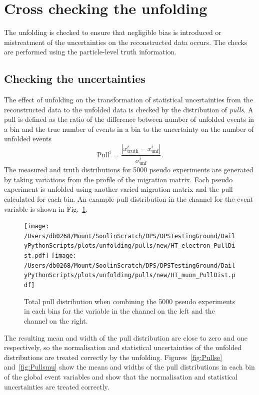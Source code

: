 \section{Cross checking the unfolding} %
\label{sec:cross_checking_the_unfolding}

The unfolding is checked to ensure that negligible bias is introduced or mistreatment of the uncertainties on the reconstructed data occurs. 
The checks are performed using the particle-level truth information.

\subsection{Checking the uncertainties} %
\label{sub:checking_the_uncertainties}

The effect of unfolding on the transformation of statistical uncertainties from the reconstructed data to the unfolded data is checked by the distribution of \textit{pulls}.
A pull is defined as the ratio of the difference between number of unfolded events in a bin and the true number of events in a bin to the uncertainty on the number of unfolded events
\begin{equation*}
\mathrm{Pull}^{i}=\frac{|x^{i}_{\mathrm{truth}}-x^{i}_{\mathrm{unf}}|}{\sigma^{i}_{\mathrm{unf}}}.
\end{equation*}
The measured and truth distributions for 5000 pseudo experiments are generated by taking variations from the profile of the \powhegpythia{} migration matrix.
Each pseudo experiment is unfolded using another varied migration matrix and the pull calculated for each bin.
An example pull distribution in the \eJets{} channel for the \HT{} event variable is shown in Fig.~\ref{fig:pullExample}.
\begin{figure}[htpb]
	\centering
	\texttt{[image: /Users/db0268/Mount/SoolinScratch/DPS/DPSTestingGround/DailyPythonScripts/plots/unfolding/pulls/new/HT\_electron\_PullDist.pdf]}
	\texttt{[image: /Users/db0268/Mount/SoolinScratch/DPS/DPSTestingGround/DailyPythonScripts/plots/unfolding/pulls/new/HT\_muon\_PullDist.pdf]}
	\caption[Total pull distribution when combining the 5000 pseudo experiments in each bins for the \HT{} variable in the \eJets{} channel on the left and the \muJets{} channel on the right.]{Total pull distribution when combining the 5000 pseudo experiments in each bins for the \HT{} variable in the \eJets{} channel on the left and the \muJets{} channel on the right.}
	\label{fig:pullExample}
\end{figure}
The resulting mean and width of the pull distribution are close to zero and one respectively, so the normalisation and statistical uncertainties of the unfolded distributions are treated correctly by the unfolding.
Figures~\ref{fig:Pullse} and~\ref{fig:Pullsmu} show the means and widths of the pull distributions in each bin of the global event variables and show that the normalisation and statistical uncertainties are treated correctly.




